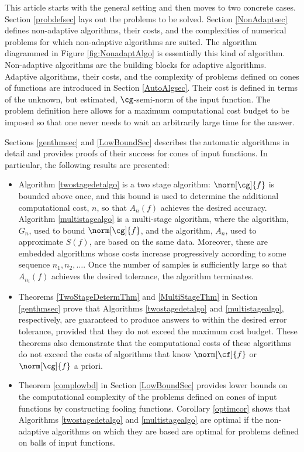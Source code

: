 \documentclass[]{elsarticle}
\theoremstyle{definition}
\theoremstyle{remark}
\begin{document}
This article starts with the general setting and then moves to two concrete cases.  Section \ref{probdefsec} lays out the problems to be solved.  Section \ref{NonAdaptsec} defines non-adaptive algorithms, their costs, and the complexities of numerical problems for which non-adaptive algorithms are suited.  The algorithm diagrammed in Figure \ref{fig:NonadaptAlgo} is essentially this kind of algorithm.  Non-adaptive algorithms are the building blocks for adaptive algorithms.  Adaptive algorithms, their costs, and the complexity of problems defined on cones of functions are introduced in Section \ref{AutoAlgsec}.  Their cost is defined in terms of the unknown, but estimated, $\cg$-semi-norm of the input function.  The problem definition here allows for a maximum computational cost budget to be imposed so that one never needs to wait an arbitrarily large time for the answer.  

Sections \ref{genthmsec} and \ref{LowBoundSec} describes the automatic algorithms in detail and provides proofs of their success for cones of input functions.  In particular, the following results are presented:
\begin{itemize}

\item Algorithm \ref{twostagedetalgo} is a two stage algorithm: $\norm[\cg]{f}$ is bounded above once, and  this bound is used to determine the additional computational cost, $n$, so that $A_n(f)$ achieves the desired accuracy. Algorithm \ref{multistagealgo} is a multi-stage algorithm, where the algorithm, $G_n$, used to bound $\norm[\cg]{f}$, and the algorithm, $A_n$, used to approximate $S(f)$, are based on the same data. Moreover, these are embedded algorithms whose costs increase progressively according to some sequence $n_1, n_2, \ldots$.  Once the number of samples is sufficiently large so that $A_{n_i}(f)$ achieves the desired tolerance, the algorithm terminates.

\item Theorems \ref{TwoStageDetermThm} and \ref{MultiStageThm} in Section \ref{genthmsec} prove that Algorithms \ref{twostagedetalgo} and \ref{multistagealgo}, respectively, are guaranteed to produce answers to within the desired error tolerance, provided that they do not exceed the maximum cost budget.  These theorems also demonstrate that the computational costs of these algorithms do not exceed the costs of algorithms that know $\norm[\cf]{f}$ or $\norm[\cg]{f}$ a priori.

\item Theorem \ref{complowbd} in Section \ref{LowBoundSec} provides lower bounds on the computational complexity of the problems defined on cones of input functions by constructing fooling functions.  Corollary \ref{optimcor} shows that Algorithms \ref{twostagedetalgo} and \ref{multistagealgo} are optimal if the non-adaptive algorithms on which they are based are optimal for problems defined on balls of input functions.

\end{itemize}
\end{document}
